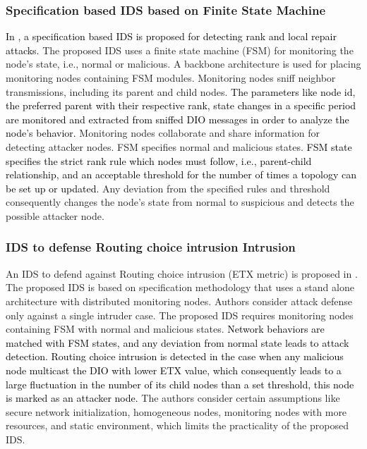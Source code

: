\documentclass[10pt,journal,sort & compress]{IEEEtran}
\begin{document}
\subsubsection*{Specification based IDS based on Finite State Machine}
\textcolor{black}{In \cite{Le2011}, a specification based IDS is proposed for detecting rank and local repair attacks.} The proposed IDS uses a finite state machine (FSM) for monitoring the node's state, i.e., normal or malicious. A backbone architecture is used for placing monitoring nodes containing FSM modules. Monitoring nodes sniff neighbor transmissions, including its parent and child nodes. \textcolor{black}{The parameters like node id, the preferred parent with their respective rank, state changes in a specific period are monitored and extracted from sniffed DIO messages in order to analyze the node's behavior.} Monitoring nodes collaborate and share information for detecting attacker nodes. FSM specifies normal and malicious states. \textcolor{black}{FSM state specifies the strict rank rule which nodes must follow, i.e., parent-child relationship, and an acceptable threshold for the number of times a topology can be set up or updated.} Any deviation from the specified rules and threshold consequently changes the node's state from normal to suspicious and detects the possible attacker node.

\subsubsection*{IDS to defense Routing choice intrusion Intrusion}
An IDS to defend against Routing choice intrusion (ETX metric) is proposed in \cite{zhang2015intrusion}. The proposed IDS is based on specification methodology that uses a stand alone architecture with distributed monitoring nodes. Authors consider attack defense only against a single intruder case. The proposed IDS requires monitoring nodes containing FSM with normal and malicious states. \textcolor{black}{Network behaviors are matched with FSM states, and any deviation from normal state leads to attack detection. Routing choice intrusion is detected in the case when any malicious node multicast the DIO with lower ETX value, which consequently leads to a large fluctuation in the number of its child nodes than a set threshold, this node is marked as an attacker node.} The authors consider certain assumptions like secure network initialization, homogeneous nodes, monitoring nodes with more resources, and static environment, which limits the practicality of the proposed IDS.
\end{document}
